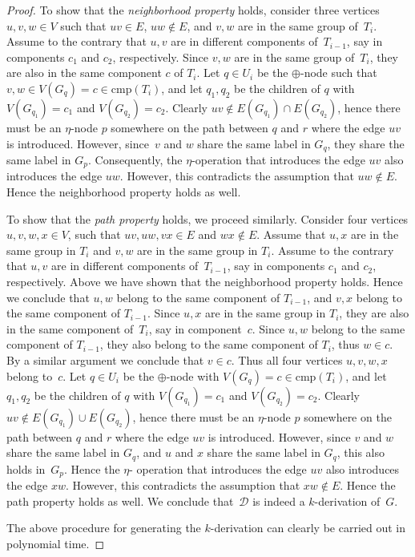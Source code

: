 \documentclass[10pt,usletter]{article}
\theoremstyle{remark}
\newcommand{\DDD}{\mathcal{D}}
\newcommand{\hy}{\hbox{-}\nobreak\hskip0pt}
\newcommand{\comps}{\text{cmp}}
\begin{document}
\begin{proof}
    To show that the \emph{neighborhood property} holds, consider
    three vertices $u,v,w\in V$ such that $uv\in E$, $uw\notin E$, and
    $v,w$ are in the same group of~$T_i$. Assume to the contrary that
    $u,v$ are in different components of~$T_{i-1}$, say in components
    $c_1$ and $c_2$, respectively.  Since $v,w$ are in the same group
    of~$T_i$, they are also in the same component $c$ of $T_i$. Let
    $q\in U_i$ be the $\oplus$\hy node such that $v,w\in V(G_q)=c\in
    \comps(T_i)$, and let $q_1,q_2$ be the children of $q$ with
    $V(G_{q_1})=c_1$ and $V(G_{q_2})=c_2$.  Clearly $uv\notin
    E(G_{q_1})\cap E(G_{q_2})$, hence there must be an $\eta$\hy node
    $p$ somewhere on the path between $q$ and $r$ where the edge $uv$
    is introduced. However, since~$v$ and $w$ share the same label in
    $G_q$, they share the same label in $G_p$. Consequently, the
    $\eta$\hy operation that introduces the edge $uv$ also introduces
    the edge $uw$. However, this contradicts the assumption that
    $uw\notin E$. Hence the neighborhood property holds as well.

    To show that the \emph{path property} holds, we proceed
    similarly. Consider four vertices $u,v,w,x\in V$, such that $uv,
    uw, vx \in E$ and $wx \notin E$. Assume that $u,x$ are in the same
    group in $T_i$ and $v,w$ are in the same group in $T_i$. Assume to
    the contrary that $u,v$ are in different components of~$T_{i-1}$,
    say in components $c_1$ and $c_2$, respectively. Above we have
    shown that the neighborhood property holds. Hence we conclude that
    $u,w$ belong to the same component of $T_{i-1}$, and $v,x$ belong
    to the same component of $T_{i-1}$.  Since $u,x$ are in the same
    group in $T_i$, they are also in the same component of~$T_i$, say
    in component~$c$.  Since $u,w$ belong to the same component of
    $T_{i-1}$, they also belong to the same component of $T_i$, thus
    $w\in c$. By a similar argument we conclude that $v\in c$.  Thus
    all four vertices $u,v,w,x$ belong to~$c$.  Let $q\in U_i$ be the
    $\oplus$\hy node with $V(G_q)=c\in \comps(T_i)$, and let $q_1,q_2$
    be the children of $q$ with $V(G_{q_1})=c_1$ and $V(G_{q_2})=c_2$.
    Clearly $uv\notin E(G_{q_1})\cup E(G_{q_2})$, hence there must be
    an $\eta$\hy node $p$ somewhere on the path between $q$ and $r$
    where the edge $uv$ is introduced. However, since $v$ and $w$
    share the same label in $G_q$, and $u$ and $x$ share the same
    label in $G_q$, this also holds in~$G_p$. Hence the $\eta$\hy
    operation that introduces the edge $uv$ also introduces the edge
    $xw$. However, this contradicts the assumption that $xw\notin
    E$. Hence the path property holds as well. We conclude that~$\DDD$
    is indeed a $k$\hy derivation of~$G$.


    The above procedure for generating the $k$\hy derivation can clearly
    be carried out in polynomial time.
\end{proof}
\end{document}
